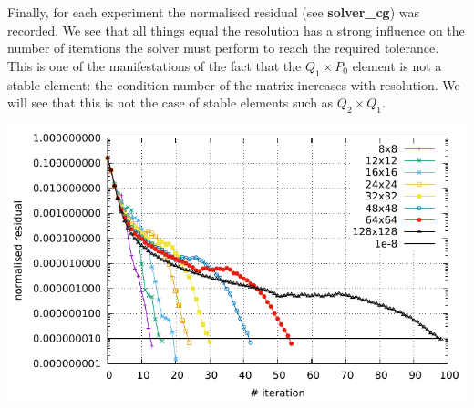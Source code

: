 Finally, for each experiment the normalised residual (see {\bf solver\_cg}) was recorded. We see that 
all things equal the resolution has a strong influence on the number of iterations the solver must
perform to reach the required tolerance. This is one of the manifestations of the fact that the 
$Q_1 \times P_0$ element is not a stable element: the condition number of the matrix increases with 
resolution. We will see that this is not the case of stable elements such as $Q_2\times Q_1$.

\includegraphics[width=16cm]{python_codes/fieldstone_15/images/residual.pdf}
 

